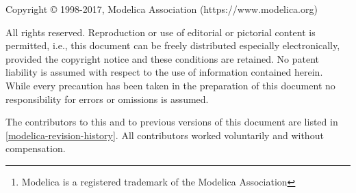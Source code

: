 \hypersetup{pageanchor=false,bookmarksdepth=2,destlabel=true,bookmarksopenlevel=0}
\begin{abstract}
\begin{center}
\texttt{[image: image1]}
\end{center}
This document defines the Modelica\footnote{Modelica is a registered
  trademark of the Modelica Association} language, version 3.5, which is
developed by the Modelica Association, a non-profit organization with
seat in Linköping, Sweden. Modelica is a freely available,
object-oriented language for modeling of large, complex, and
heterogeneous systems. It is suited for multi-domain modeling, for
example, mechatronic models in robotics, automotive and aerospace
applications involving mechanical, electrical, hydraulic control and
state machine subsystems, process oriented applications and generation
and distribution of electric power. Models in Modelica are
mathematically described by differential, algebraic and discrete
equations. No particular variable needs to be solved for manually. A
Modelica tool will have enough information to decide that automatically.
Modelica is designed such that available, specialized algorithms can be
utilized to enable efficient handling of large models having more than
one hundred thousand equations. Modelica is suited and used for
hardware-in-the-loop simulations and for embedded control systems. More
information is available at
\href{http://www.modelica.org/}{http://www.Modelica.org/}
\end{abstract}
\hypersetup{pageanchor=true}
Copyright © 1998-2017, Modelica Association (https://www.modelica.org)

All rights reserved. Reproduction or use of editorial or pictorial
content is permitted, i.e., this document can be freely distributed
especially electronically, provided the copyright notice and these
conditions are retained. No patent liability is assumed with respect to
the use of information contained herein. While every precaution has been
taken in the preparation of this document no responsibility for errors
or omissions is assumed.

The contributors to this and to previous versions of this document are
listed in \autoref{modelica-revision-history}. All contributors worked voluntarily and without
compensation.

\tableofcontents
